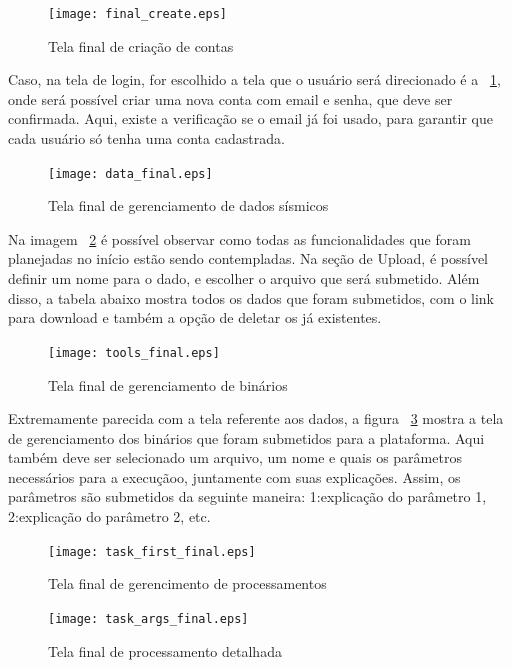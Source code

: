\documentclass[11pt,twoside]{article}
\begin{document}
\begin{figure}[!h]
  \centering
  \texttt{[image: final\_create.eps]}
  \caption{Tela final de criação de contas}
  \label{fig:finalCreate}
\end{figure}

Caso, na tela de login, for escolhido a tela que o usuário será direcionado é a ~\ref{fig:finalCreate}, onde será possível criar uma nova conta com email e senha, que deve ser confirmada. Aqui, existe a verificação
se o email já foi usado, para garantir que cada usuário só tenha uma conta cadastrada.

\begin{figure}[!h]
  \centering
  \texttt{[image: data\_final.eps]}
  \caption{Tela final de gerenciamento de dados sísmicos}
  \label{fig:finalData}
\end{figure}

Na imagem ~\ref{fig:finalData} é possível observar como todas as funcionalidades que foram planejadas no início estão sendo contempladas. Na seção de Upload, é possível definir um nome para o dado, e escolher o 
arquivo que será submetido. Além disso, a tabela abaixo mostra todos os dados que foram submetidos, com o link para download e também a opção de deletar os já existentes.

\begin{figure}[!h]
  \centering
  \texttt{[image: tools\_final.eps]}
  \caption{Tela final de gerenciamento de binários}
  \label{fig:finalTools}
\end{figure}

Extremamente parecida com a tela referente aos dados, a figura ~\ref{fig:finalTools} mostra a tela de gerenciamento dos binários que foram submetidos para a plataforma. Aqui também deve
ser selecionado um arquivo, um nome e quais os parâmetros necessários para a execuçãoo, juntamente com suas explicações. Assim, os parâmetros são submetidos da seguinte maneira: 1:explicação do parâmetro 1,
2:explicação do parâmetro 2, etc.

\begin{figure}[!h]
  \centering
  \texttt{[image: task\_first\_final.eps]}
  \caption{Tela final de gerencimento de processamentos}
  \label{fig:finalTasks}
\end{figure}

\begin{figure}[!h]
  \centering
  \texttt{[image: task\_args\_final.eps]}
  \caption{Tela final de processamento detalhada}
  \label{fig:finalDetailedTask}
\end{figure}
\end{document}
